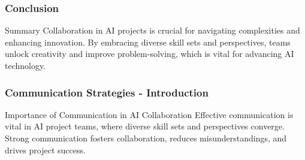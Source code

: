 \documentclass[aspectratio=169]{beamer}
\begin{document}
\begin{frame}[fragile]
    \frametitle{Conclusion}
    \begin{block}{Summary}
        Collaboration in AI projects is crucial for navigating complexities and enhancing innovation. By embracing diverse skill sets and perspectives, teams unlock creativity and improve problem-solving, which is vital for advancing AI technology.
    \end{block}
\end{frame}

\begin{frame}[fragile]
    \frametitle{Communication Strategies - Introduction}
    \begin{block}{Importance of Communication in AI Collaboration}
        Effective communication is vital in AI project teams, where diverse skill sets and perspectives converge. 
        Strong communication fosters collaboration, reduces misunderstandings, and drives project success.
    \end{block}
\end{frame}
\end{document}
